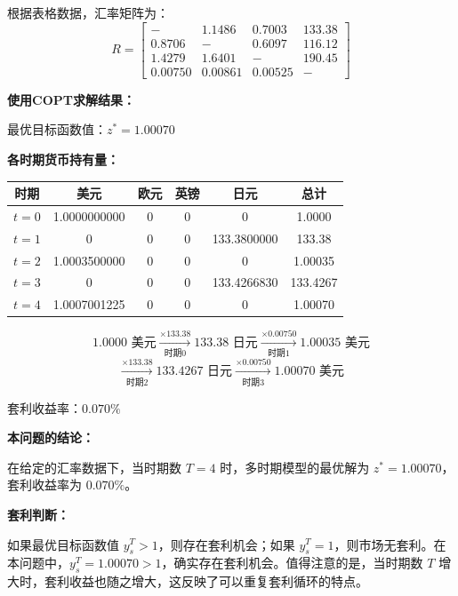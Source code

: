 \documentclass[12pt,a4paper]{article}
\begin{document}
根据表格数据，汇率矩阵为：
\[
R = \begin{bmatrix}
- & 1.1486 & 0.7003 & 133.38 \\
0.8706 & - & 0.6097 & 116.12 \\
1.4279 & 1.6401 & - & 190.45 \\
0.00750 & 0.00861 & 0.00525 & -
\end{bmatrix}
\]

\textbf{使用COPT求解结果：}

最优目标函数值：$z^* = 1.00070$

\textbf{各时期货币持有量：}

\begin{table}[h]
\centering
\begin{tabular}{|c|c|c|c|c|c|}
\hline
时期 & 美元 & 欧元 & 英镑 & 日元 & 总计 \\
\hline
$t=0$ & 1.0000000000 & 0 & 0 & 0 & 1.0000 \\
$t=1$ & 0 & 0 & 0 & 133.3800000 & 133.38 \\
$t=2$ & 1.0003500000 & 0 & 0 & 0 & 1.00035 \\
$t=3$ & 0 & 0 & 0 & 133.4266830 & 133.4267 \\
$t=4$ & 1.0007001225 & 0 & 0 & 0 & 1.00070 \\
\hline
\end{tabular}
\end{table}









\[
1.0000 \text{ 美元} \xrightarrow[\text{时期0}]{\times 133.38} 133.38 \text{ 日元} \xrightarrow[\text{时期1}]{\times 0.00750} 1.00035 \text{ 美元}\]
\[
\xrightarrow[\text{时期2}]{\times 133.38} 133.4267 \text{ 日元} \xrightarrow[\text{时期3}]{\times 0.00750} 1.00070 \text{ 美元}
\]

    套利收益率：$ 0.070\%$





\textbf{本问题的结论：}

在给定的汇率数据下，当时期数 $T = 4$ 时，多时期模型的最优解为 $z^* = 1.00070$，套利收益率为 $0.070\%$。

\textbf{套利判断：}

如果最优目标函数值 $y_s^T > 1$，则存在套利机会；如果 $y_s^T = 1$，则市场无套利。在本问题中，$y_s^T = 1.00070 > 1$，确实存在套利机会。值得注意的是，当时期数 $T$ 增大时，套利收益也随之增大，这反映了可以重复套利循环的特点。
\end{document}
